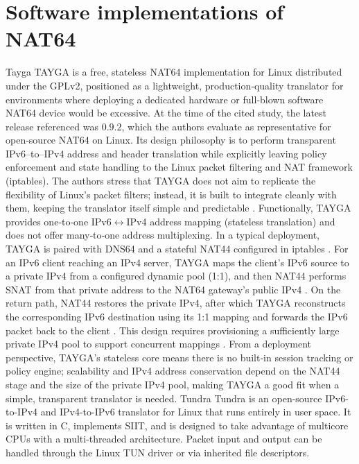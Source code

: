 \section{Software implementations of NAT64}
Tayga
TAYGA is a free, stateless NAT64 implementation for Linux distributed under the GPLv2, positioned as a lightweight, production‑quality translator for environments where deploying a dedicated hardware or full‑blown software NAT64 device would be excessive\cite{Repas_Farnadi_Lencse_2014}. At the time of the cited study, the latest release referenced was $0.9.2$, which the authors evaluate as representative for open‑source NAT64 on Linux\cite{palrd_tayga_readme}.
Its design philosophy is to perform transparent IPv6–to–IPv4 address and header translation while explicitly leaving policy enforcement and state handling to the Linux packet filtering and NAT framework (iptables)\cite{Repas_Farnadi_Lencse_2014}. The authors stress that TAYGA does not aim to replicate the flexibility of Linux’s packet filters; instead, it is built to integrate cleanly with them, keeping the translator itself simple and predictable \cite{Repas_Farnadi_Lencse_2014}.
Functionally, TAYGA provides one‑to‑one IPv6$\leftrightarrow$IPv4 address mapping (stateless translation) and does not offer many‑to‑one address multiplexing. In a typical deployment, TAYGA is paired with DNS64 and a stateful NAT44 configured in iptables \cite{Repas_Farnadi_Lencse_2014}. For an IPv6 client reaching an IPv4 server, TAYGA maps the client’s IPv6 source to a private IPv4 from a configured dynamic pool (1:1), and then NAT44 performs SNAT from that private address to the NAT64 gateway’s public IPv4 \cite{Repas_Farnadi_Lencse_2014}. On the return path, NAT44 restores the private IPv4, after which TAYGA reconstructs the corresponding IPv6 destination using its 1:1 mapping and forwards the IPv6 packet back to the client \cite{Repas_Farnadi_Lencse_2014}. This design requires provisioning a sufficiently large private IPv4 pool to support concurrent mappings \cite{Repas_Farnadi_Lencse_2014}.
From a deployment perspective, TAYGA’s stateless core means there is no built‑in session tracking or policy engine; scalability and IPv4 address conservation depend on the NAT44 stage and the size of the private IPv4 pool, making TAYGA a good fit when a simple, transparent translator is needed\cite{Repas_Farnadi_Lencse_2014}. 
Tundra
Tundra is an open-source IPv6-to-IPv4 and IPv4-to-IPv6 translator for Linux that runs entirely in user space. It is written in C, implements SIIT\cite{rfc7915}, and is designed to take advantage of multicore CPUs with a multi-threaded architecture. Packet input and output can be handled through the Linux TUN driver or via inherited file descriptors\cite{labuda_tundra_nat64}.
